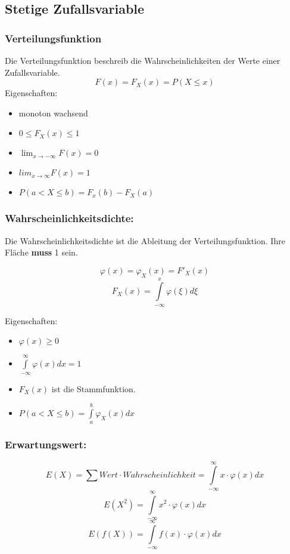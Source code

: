 \documentclass[margin=normal]{tex/hsrzf}
\begin{document}
\subsection{Stetige Zufallsvariable}
\begin{multicols}{2}
    
    \subsubsection*{Verteilungsfunktion}
    Die Verteilungsfunktion beschreib die Wahrscheinlichkeiten der Werte einer Zufallsvariable.
$$F(x)= F_X(x) = P(X \leq x)$$
Eigenschaften:
\begin{itemize}
    \item monoton wachsend
    \item $0 \leq F_X(x) \leq 1$
    \item $\lim_{x \to -\infty}  F(x) = 0$
    \item $lim_{x \to \infty} F(x) = 1$
    \item $P(a < X \leq b) = F_x(b) - F_X(a)$
\end{itemize}

\subsubsection*{Wahrscheinlichkeitsdichte:}
Die Wahrscheinlichkeitsdichte ist die Ableitung der Verteilungsfunktion.
Ihre Fläche \textbf{muss} 1 sein.

$$\varphi(x) = \varphi_X(x) = F'_X(x)$$
$$F_X(x) = \int \limits _{-\infty} ^{x} \varphi(\xi)d\xi$$

Eigenschaften:
\begin{itemize}
    \item $\varphi(x) \geq 0$
    \item $\int \limits _{-\infty} ^{\infty} \varphi(x)dx = 1$
    \item $F_X(x)$ ist die Stammfunktion.
    \item $P(a < X \leq b) =\int \limits _a ^b \varphi_X(x)dx$
\end{itemize}

\subsubsection{Erwartungswert:}
$$E(X) = \sum Wert \cdot Wahrscheinlichkeit = \int \limits _{-\infty} ^{\infty} x \cdot \varphi(x)dx $$
$$E(X^2) = \int \limits _{-\infty} ^{\infty} x^2 \cdot \varphi(x) dx$$
$$E(f(X)) = \int \limits _{-\infty} ^{\infty} f(x) \cdot \varphi(x)dx$$


\end{multicols}
\end{document}
